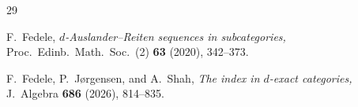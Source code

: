 \documentclass[12pt,reqno]{amsart}
\numberwithin{equation}{section}
\theoremstyle{definition}
\theoremstyle{theorem}
\theoremstyle{definition}
\begin{document}
\begin{thebibliography}{29}



  F.\ Fedele, {\it $d$-Auslander--Reiten sequences in subcategories,} Proc.\ Edinb.\ Math.\ Soc.\ (2) {\bf 63} (2020), 342--373.

  F.\ Fedele, P.\ J\o rgensen, and A.\ Shah, {\it The index in $d$-exact categories,} J.\ Algebra {\bf 686} (2026), 814--835.

%
%








\end{thebibliography}
\end{document}

